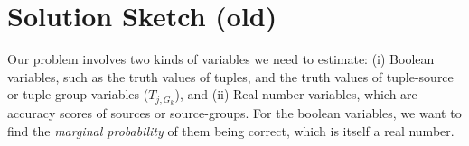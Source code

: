 \documentclass{sig-alternate}
\newcounter{prob}
\begin{document}


\section{Solution Sketch (old)}
Our problem involves two kinds of variables we need to estimate: (i) Boolean variables, such as the truth values of tuples, and the truth values of tuple-source or tuple-group variables ($T_{j,G_k}$), and (ii) Real number variables, which are accuracy scores of sources or source-groups. For the boolean variables, we want to find the \textit{marginal probability} of them being correct, which is itself a real number. 
\end{document}
